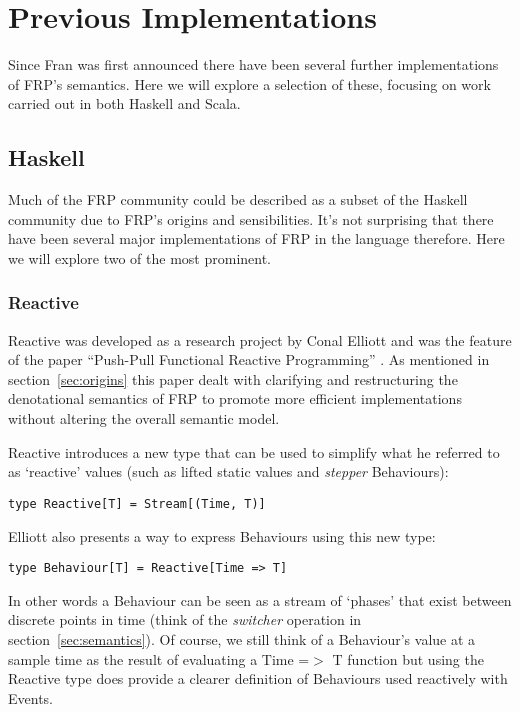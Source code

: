 \chapter{Previous Implementations}
  Since Fran was first announced there have been several further implementations of FRP's semantics. Here
  we will explore a selection of these, focusing on work carried out in both Haskell and Scala.
  
  \section{Haskell}
    Much of the FRP community could be described as a subset of the Haskell community due to FRP's
    origins and sensibilities. It's not surprising that there have been several major implementations
    of FRP in the language therefore. Here we will explore two of the most prominent.
    
    \subsection{Reactive}
      Reactive was developed as a research project by Conal Elliott and was the feature
      of the paper ``Push-Pull Functional Reactive Programming'' \cite{Elliott2009}. As mentioned
      in section~\ref{sec:origins} this paper dealt with clarifying and restructuring the denotational
      semantics of FRP
      to promote more efficient implementations without altering the overall semantic model.
      
      Reactive introduces a new type that can be used to simplify what he referred to as
      `reactive' values (such as lifted static values and \emph{stepper} Behaviours):
    
\begin{verbatim}
type Reactive[T] = Stream[(Time, T)]
\end{verbatim}

      Elliott also presents a way to express Behaviours using this new type:
      
\begin{verbatim}
type Behaviour[T] = Reactive[Time => T]
\end{verbatim}      

      In other words a Behaviour can be seen as a stream of `phases' that exist between discrete
      points in time (think of the \emph{switcher} operation in section~\ref{sec:semantics}). Of course, we
      still think of a Behaviour's value at a sample time as the result of evaluating a
      Time =$>$ T function but using the Reactive type
      does provide a clearer definition of Behaviours used reactively with Events.
      
